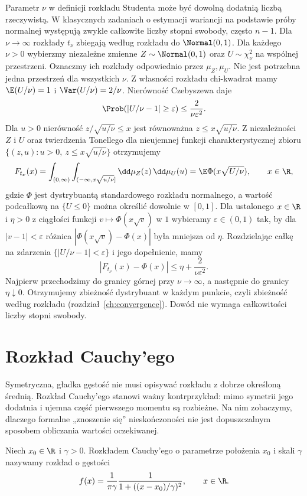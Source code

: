 \begin{uwaga}
Parametr $\nu$ w definicji rozkładu Studenta może być dowolną
dodatnią liczbą rzeczywistą. W klasycznych zadaniach o estymacji
wariancji na podstawie próby normalnej występują zwykle całkowite
liczby stopni swobody, często $n-1$.
Dla $\nu\to\infty$ rozkłady $t_\nu$ zbiegają według
rozkładu do $\Normal(0,1)$. Dla każdego $\nu>0$
wybierzmy niezależne zmienne $Z\sim\Normal(0,1)$
oraz $U\sim\chi^2_\nu$ na wspólnej przestrzeni.
Oznaczmy ich rozkłady odpowiednio przez $\mu_Z,\mu_U$.
Nie jest potrzebna jedna przestrzeń dla wszystkich $\nu$.
Z własności rozkładu chi-kwadrat mamy $\E(U/\nu)=1$ i
$\Var(U/\nu)=2/\nu$. Nierówność Czebyszewa daje
\[
\Prob(|U/\nu-1|\geq\varepsilon)\leq
\frac{2}{\nu\varepsilon^2}.
\]
Dla $u>0$ nierówność $z/\sqrt{u/\nu}\leq x$
jest równoważna $z\leq x\sqrt{u/\nu}$.
Z niezależności $Z$ i $U$ oraz twierdzenia Tonellego
dla nieujemnej funkcji charakterystycznej zbioru
$\{(z,u):u>0,\ z\leq x\sqrt{u/\nu}\}$ otrzymujemy
\[
F_{t_\nu}(x)=
\int_{(0,\infty)}\int_{(-\infty,x\sqrt{u/\nu}]}
\dd\mu_Z(z)\,\dd\mu_U(u)
=\E\Phi(x\sqrt{U/\nu}),
\qquad x\in\R,
\]
gdzie $\Phi$ jest dystrybuantą standardowego rozkładu
normalnego, a wartość podcałkową na $\{U\leq0\}$
można określić dowolnie w $[0,1]$.
Dla ustalonego $x\in\R$ i $\eta>0$ z ciągłości funkcji
$v\mapsto\Phi(x\sqrt v)$ w $1$ wybieramy
$\varepsilon\in(0,1)$ tak, by dla $|v-1|<\varepsilon$
różnica $|\Phi(x\sqrt v)-\Phi(x)|$ była mniejsza od $\eta$.
Rozdzielając całkę na zdarzenia
$\{|U/\nu-1|<\varepsilon\}$ i jego dopełnienie, mamy
\[
|F_{t_\nu}(x)-\Phi(x)|
\leq\eta+\frac{2}{\nu\varepsilon^2}.
\]
Najpierw przechodzimy do granicy górnej przy
$\nu\to\infty$, a następnie do granicy $\eta\downarrow0$.
Otrzymujemy zbieżność dystrybuant w każdym punkcie,
czyli zbieżność według rozkładu
(rozdział~\ref{ch:convergence}). Dowód nie wymaga
całkowitości liczby stopni swobody.
\end{uwaga}

\section{Rozkład Cauchy'ego}
Symetryczna, gładka gęstość nie musi opisywać rozkładu z dobrze
określoną średnią. Rozkład Cauchy'ego stanowi ważny kontrprzykład:
mimo symetrii jego dodatnia i ujemna część pierwszego momentu
są rozbieżne. Na nim zobaczymy, dlaczego formalne „znoszenie się”
nieskończoności nie jest dopuszczalnym sposobem obliczania
wartości oczekiwanej.

\begin{definicja}
Niech $x_0\in\R$ i $\gamma>0$. Rozkładem Cauchy'ego
o parametrze położenia $x_0$ i skali $\gamma$
nazywamy rozkład o gęstości
\begin{equation}\label{eq:cauchy}
f(x)=\frac1{\pi\gamma}
\frac{1}{1+((x-x_0)/\gamma)^2},\qquad x\in\R.
\end{equation}
\end{definicja}

